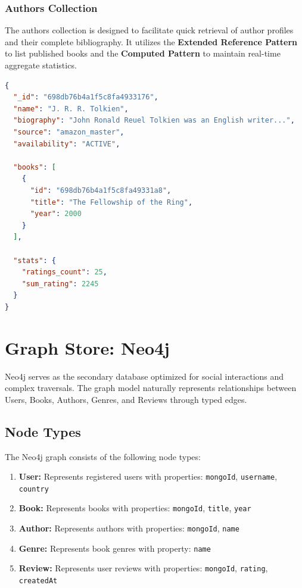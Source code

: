 \subsubsection{Authors Collection}
The authors collection is designed to facilitate quick retrieval of author profiles and their complete bibliography. It utilizes the \textbf{Extended Reference Pattern} to list published books and the \textbf{Computed Pattern} to maintain real-time aggregate statistics.

\begin{lstlisting}[language=json, caption={Author Document Structure}, label={lst:author_json}]
{
  "_id": "698db76b4a1f5c8fa4933176",
  "name": "J. R. R. Tolkien",
  "biography": "John Ronald Reuel Tolkien was an English writer...",
  "source": "amazon_master",
  "availability": "ACTIVE",
  
  "books": [
    {
      "id": "698db76b4a1f5c8fa49331a8",
      "title": "The Fellowship of the Ring",
      "year": 2000
    }
  ],
  
  "stats": {
    "ratings_count": 25,
    "sum_rating": 2245
  }
}
\end{lstlisting}

\section{Graph Store: Neo4j}
Neo4j serves as the secondary database optimized for social interactions and complex traversals. The graph model naturally represents relationships between Users, Books, Authors, Genres, and Reviews through typed edges.

\subsection{Node Types}
The Neo4j graph consists of the following node types:

\begin{enumerate}
    \item \textbf{User:} Represents registered users with properties: \texttt{mongoId}, \texttt{username}, \texttt{country}
    \item \textbf{Book:} Represents books with properties: \texttt{mongoId}, \texttt{title}, \texttt{year}
    \item \textbf{Author:} Represents authors with properties: \texttt{mongoId}, \texttt{name}
    \item \textbf{Genre:} Represents book genres with property: \texttt{name}
    \item \textbf{Review:} Represents user reviews with properties: \texttt{mongoId}, \texttt{rating}, \texttt{createdAt}
\end{enumerate}

